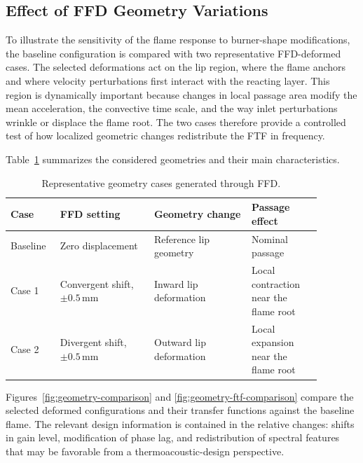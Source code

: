 \documentclass{iopconfser}
\begin{document}
\subsection{Effect of FFD Geometry Variations}
\label{subsec:geometry-variations}

To illustrate the sensitivity of the flame response to burner-shape modifications, the baseline configuration is compared with two representative FFD-deformed cases. The selected deformations act on the lip region, where the flame anchors and where velocity perturbations first interact with the reacting layer. This region is dynamically important because changes in local passage area modify the mean acceleration, the convective time scale, and the way inlet perturbations wrinkle or displace the flame root. The two cases therefore provide a controlled test of how localized geometric changes redistribute the FTF in frequency.

Table~\ref{tab:geometry-cases} summarizes the considered geometries and their main characteristics.

\begin{table}[!htbp]
  \centering
  \caption{Representative geometry cases generated through FFD.}
  \label{tab:geometry-cases}
  \small
  \setlength{\tabcolsep}{4pt}
  \renewcommand{\arraystretch}{1.15}
  \begin{tabular}{@{}p{0.12\linewidth}p{0.27\linewidth}p{0.29\linewidth}p{0.20\linewidth}@{}}
    \toprule
    Case & FFD setting & Geometry change & Passage effect \\
    \midrule
    Baseline & Zero displacement & Reference lip geometry & Nominal passage \\
    Case 1 & Convergent shift, $\pm 0.5\,\mathrm{mm}$ & Inward lip deformation & Local contraction near the flame root \\
    Case 2 & Divergent shift, $\pm 0.5\,\mathrm{mm}$ & Outward lip deformation & Local expansion near the flame root \\
    \bottomrule
  \end{tabular}
\end{table}

Figures~\ref{fig:geometry-comparison} and \ref{fig:geometry-ftf-comparison} compare the selected deformed configurations and their transfer functions against the baseline flame. The relevant design information is contained in the relative changes: shifts in gain level, modification of phase lag, and redistribution of spectral features that may be favorable from a thermoacoustic-design perspective.
\end{document}
